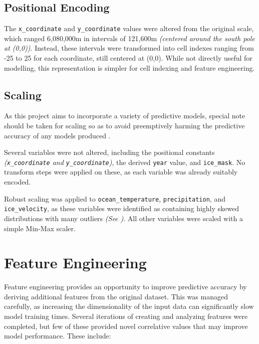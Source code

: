 \subsection{Positional Encoding}

The \texttt{x\_coordinate} and \texttt{y\_coordinate} values were altered from the original scale, which ranged 6,080,000m in intervals of 121,600m \textit{(centered around the south pole at (0,0))}. Instead, these intervals were transformed into cell indexes ranging from -25 to 25 for each coordinate, still centered at (0,0). While not directly useful for modelling, this representation is simpler for cell indexing and feature engineering.

\subsection{Scaling}

As this project aims to incorporate a variety of predictive models, special note should be taken for scaling so as to avoid preemptively harming the predictive accuracy of any models produced \cite{Ahsan2021}. 

Several variables were not altered, including the positional constants \textit{(\texttt{x\_coordinate} and \texttt{y\_coordinate})}, the derived \texttt{year} value, and \texttt{ice\_mask}. No transform steps were applied on these, as each variable was already suitably encoded.

Robust scaling was applied to \texttt{ocean\_temperature}, \texttt{precipitation}, and \texttt{ice\_velocity}, as these variables were identified as containing highly skewed distributions with many outliers \textit{(See )}. All other variables were scaled with a simple Min-Max scaler.


\section{Feature Engineering}\label{S:feature_engineering}

Feature engineering provides an opportunity to improve predictive accuracy by deriving additional features from the original dataset. This was managed carefully, as increasing the dimensionality of the input data can significantly slow model training times. Several iterations of creating and analyzing features were completed, but few of these provided novel correlative values that may improve model performance. These include:

